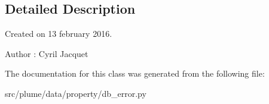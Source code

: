 \subsection{Detailed Description}
Created on 13 february 2016. 

\begin{DoxyAuthor}{Author}
\+: Cyril Jacquet 
\end{DoxyAuthor}


The documentation for this class was generated from the following file\+:\begin{DoxyCompactItemize}
\item 
src/plume/data/property/db\+\_\+error.\+py\end{DoxyCompactItemize}
